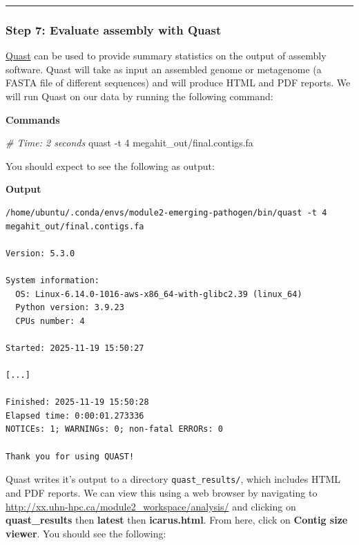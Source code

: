\documentclass[
]{book}
\newenvironment{Shaded}{\begin{snugshade}}{\end{snugshade}}
\newcommand{\AttributeTok}[1]{\textcolor[rgb]{0.13,0.29,0.53}{#1}}
\newcommand{\CommentTok}[1]{\textcolor[rgb]{0.56,0.35,0.01}{\textit{#1}}}
\newcommand{\ExtensionTok}[1]{#1}
\newcommand{\NormalTok}[1]{#1}
\begin{document}
\begin{center}\rule{0.5\linewidth}{0.5pt}\end{center}

\subsubsection{Step 7: Evaluate assembly with Quast}\label{exercise-evaluate-assembly}

\href{http://quast.sourceforge.net/quast}{Quast} can be used to provide summary statistics on the output of assembly software. Quast will take as input an assembled genome or metagenome (a FASTA file of different sequences) and will produce HTML and PDF reports. We will run Quast on our data by running the following command:

\textbf{Commands}

\begin{Shaded}
\begin{Highlighting}[]
\CommentTok{\# Time: 2 seconds}
\ExtensionTok{quast} \AttributeTok{{-}t}\NormalTok{ 4 megahit\_out/final.contigs.fa}
\end{Highlighting}
\end{Shaded}

You should expect to see the following as output:

\textbf{Output}

\begin{verbatim}
/home/ubuntu/.conda/envs/module2-emerging-pathogen/bin/quast -t 4 megahit_out/final.contigs.fa

Version: 5.3.0

System information:
  OS: Linux-6.14.0-1016-aws-x86_64-with-glibc2.39 (linux_64)
  Python version: 3.9.23
  CPUs number: 4

Started: 2025-11-19 15:50:27

[...]

Finished: 2025-11-19 15:50:28
Elapsed time: 0:00:01.273336
NOTICEs: 1; WARNINGs: 0; non-fatal ERRORs: 0

Thank you for using QUAST!
\end{verbatim}

Quast writes it's output to a directory \texttt{quast\_results/}, which includes HTML and PDF reports. We can view this using a web browser by navigating to \url{http://xx.uhn-hpc.ca/module2_workspace/analysis/} and clicking on \textbf{quast\_results} then \textbf{latest} then \textbf{icarus.html}. From here, click on \textbf{Contig size viewer}. You should see the following:
\end{document}

